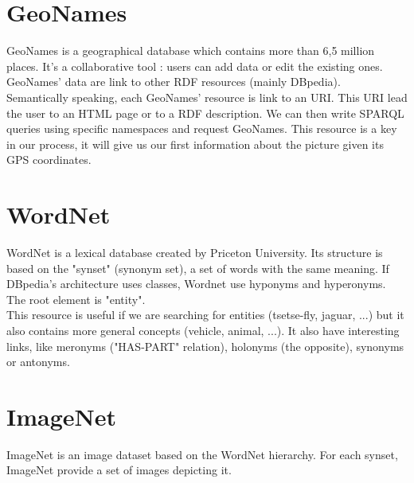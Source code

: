 
\section{GeoNames}

GeoNames is a geographical database which contains more than 6,5 million places. It's a collaborative tool : users can add data or edit the existing ones. GeoNames' data are link to other RDF resources (mainly DBpedia). \\

Semantically speaking, each GeoNames' resource is link to an URI. This URI lead the user to an HTML page or to a RDF description. We can then write SPARQL queries using specific namespaces and request GeoNames. This resource is a key in our process, it will give us our first information about the picture given its GPS coordinates.

\section{WordNet}

WordNet is a lexical database created by Priceton University. Its structure is based on the "synset" (synonym set), a set of words with the same meaning. If DBpedia's architecture uses classes, Wordnet use hyponyms and hyperonyms. The root element is "entity".\\

This resource is useful if we are searching for entities (tsetse-fly, jaguar, ...) but it also contains more general concepts (vehicle, animal, ...). It also have interesting links, like meronyms ("HAS-PART" relation), holonyms (the opposite), synonyms or antonyms.

\section{ImageNet}

ImageNet is an image dataset based on the WordNet hierarchy. For each synset, ImageNet provide a set of images depicting it.